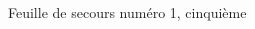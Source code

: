 \documentclass[a4paper,10pt]{article}
\begin{document}
\begin{feuilleExo}{Feuille de secours numéro 1, cinquième}
    \begin{multicols}{2}

    \end{multicols}
\end{feuilleExo}
\end{document}
